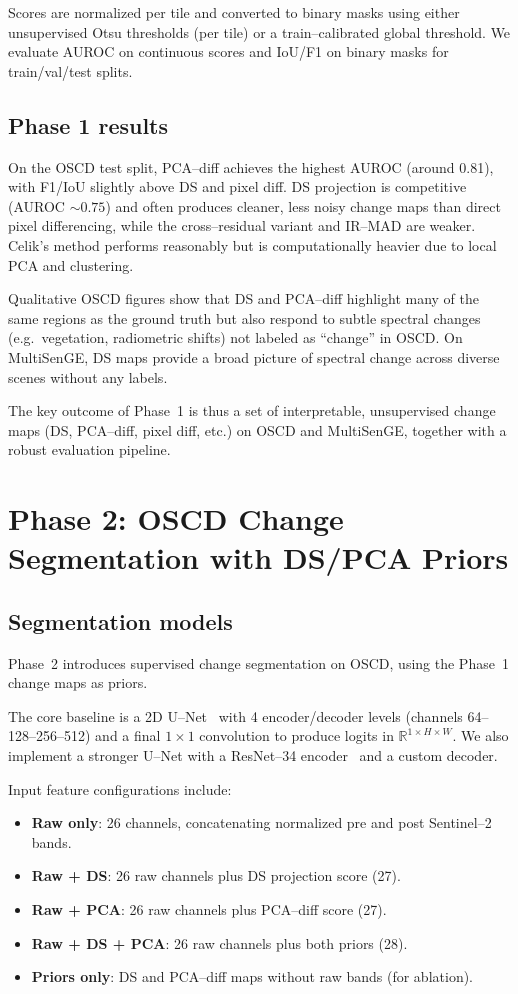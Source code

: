 \documentclass[twoside,11pt]{article}
\begin{document}
Scores are normalized per tile and converted to binary masks using either
unsupervised Otsu thresholds (per tile) or a train--calibrated global
threshold. We evaluate AUROC on continuous scores and IoU/F1 on binary masks
for train/val/test splits.

\subsection{Phase 1 results}

On the OSCD test split, PCA--diff achieves the highest AUROC (around 0.81),
with F1/IoU slightly above DS and pixel diff. DS projection is competitive
(AUROC \(\sim 0.75\)) and often produces cleaner, less noisy change maps than
direct pixel differencing, while the cross--residual variant and IR--MAD are
weaker. Celik's method performs reasonably but is computationally heavier due
to local PCA and clustering.

Qualitative OSCD figures show that DS and PCA--diff highlight many of the
same regions as the ground truth but also respond to subtle spectral changes
(e.g.\ vegetation, radiometric shifts) not labeled as ``change'' in OSCD. On
MultiSenGE, DS maps provide a broad picture of spectral change across diverse
scenes without any labels.

The key outcome of Phase~1 is thus a set of interpretable, unsupervised
change maps (DS, PCA--diff, pixel diff, etc.) on OSCD and MultiSenGE, together
with a robust evaluation pipeline.

\section{Phase 2: OSCD Change Segmentation with DS/PCA Priors}

\subsection{Segmentation models}

Phase~2 introduces supervised change segmentation on OSCD, using the Phase~1
change maps as priors.

The core baseline is a 2D U--Net~\cite{Ronneberger2015} with 4 encoder/decoder
levels (channels 64--128--256--512) and a final \(1\times 1\) convolution to
produce logits in \(\mathbb{R}^{1 \times H \times W}\). We also implement a
stronger U--Net with a ResNet--34 encoder~\cite{He2016ResNet} and a custom
decoder.

Input feature configurations include:
\begin{itemize}
  \item \textbf{Raw only}: 26 channels, concatenating normalized pre and post
  Sentinel--2 bands.
  \item \textbf{Raw + DS}: 26 raw channels plus DS projection score (27).
  \item \textbf{Raw + PCA}: 26 raw channels plus PCA--diff score (27).
  \item \textbf{Raw + DS + PCA}: 26 raw channels plus both priors (28).
  \item \textbf{Priors only}: DS and PCA--diff maps without raw bands (for
  ablation).
\end{itemize}
\end{document}
